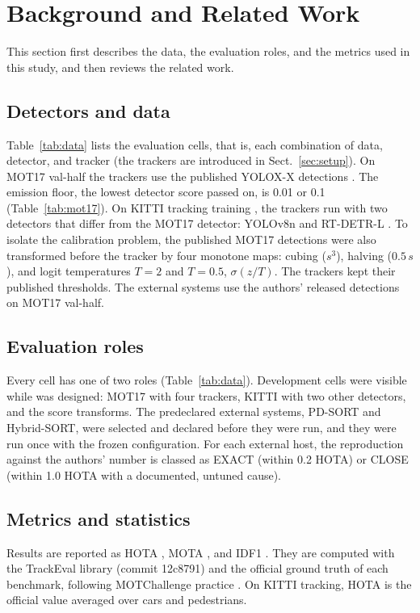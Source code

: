 \section{Background and Related Work}\label{sec:related}

This section first describes the data, the evaluation roles, and the metrics
used in this study, and then reviews the related work.

\subsection{Detectors and data}\label{sec:data}
Table~\ref{tab:data} lists the evaluation cells, that is, each combination of
data, detector, and tracker (the trackers are introduced in Sect.~\ref{sec:setup}). On MOT17 val-half
\cite{milan2016mot16} the trackers use the published YOLOX-X detections
\cite{ge2021yolox}. The emission floor, the lowest detector score passed on,
is 0.01 or 0.1 (Table~\ref{tab:mot17}). On KITTI tracking training \cite{geiger2012kitti}, the trackers run
with two detectors that differ from the MOT17 detector: YOLOv8n
\cite{jocher2023yolov8} and RT-DETR-L \cite{zhao2024rtdetr}. To isolate the
calibration problem, the published MOT17 detections were also transformed
before the tracker by four monotone maps: cubing ($s^3$), halving ($0.5\,s$),
and logit temperatures $T=2$ and $T=0.5$, $\sigma(z/T)$. The trackers kept
their published thresholds. The external systems use the authors' released
detections on MOT17 val-half.



\subsection{Evaluation roles}\label{sec:roles}
Every cell has one of two roles (Table~\ref{tab:data}). Development cells
were visible while \scl{} was designed: MOT17 with four trackers, KITTI
with two other detectors, and the score transforms. The predeclared external
systems, PD-SORT and Hybrid-SORT, were selected and declared before they were
run, and they were run once with the frozen configuration. For each external
host, the reproduction against the authors' number is classed as EXACT
(within 0.2 HOTA) or CLOSE (within 1.0 HOTA with a documented, untuned
cause).

\subsection{Metrics and statistics}\label{sec:metrics}
Results are reported as HOTA \cite{luiten2021hota}, MOTA
\cite{bernardin2008clear}, and IDF1 \cite{ristani2016idf1}. They are computed
with the TrackEval library (commit 12c8791) and the official ground truth of
each benchmark, following MOTChallenge practice
\cite{dendorfer2021motchallenge}. On KITTI tracking, HOTA is the official
value averaged over cars and pedestrians.

